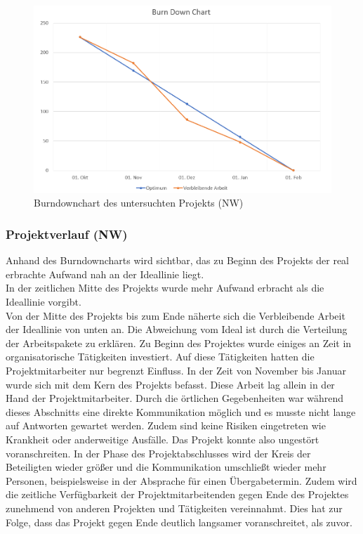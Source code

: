 \documentclass[ThesisDJ.tex]{subfiles}
\begin{document}
\begin{figure}
    \centering
    \includegraphics[width=\linewidth]{burnDownChart.png}
    \caption{Burndownchart des untersuchten Projekts (NW)}
    \label{fig:realburndown}
\end{figure}

\subsubsection{Projektverlauf (NW)}

Anhand des Burndowncharts wird sichtbar, das zu Beginn des Projekts der real erbrachte Aufwand nah an der Ideallinie liegt.\\
In der zeitlichen Mitte des Projekts wurde mehr Aufwand erbracht als die Ideallinie vorgibt.\\
Von der Mitte des Projekts bis zum Ende näherte sich die Verbleibende Arbeit der Ideallinie von unten an.
Die Abweichung vom Ideal ist durch die Verteilung der Arbeitspakete zu erklären. Zu Beginn des Projektes wurde einiges an Zeit in organisatorische Tätigkeiten investiert. Auf diese Tätigkeiten hatten die Projektmitarbeiter nur begrenzt Einfluss. In der Zeit von November bis Januar wurde sich mit dem Kern des Projekts befasst. Diese Arbeit lag allein in der Hand der Projektmitarbeiter. Durch die örtlichen Gegebenheiten war während dieses Abschnitts eine direkte Kommunikation möglich und es musste nicht lange auf Antworten gewartet werden. Zudem sind keine Risiken eingetreten wie Krankheit oder anderweitige Ausfälle. Das Projekt konnte also ungestört voranschreiten. 
In der Phase des Projektabschlusses wird der Kreis der Beteiligten wieder größer und die Kommunikation umschließt wieder mehr Personen, beispielsweise in der Absprache für einen Übergabetermin. Zudem wird die zeitliche Verfügbarkeit der Projektmitarbeitenden gegen Ende des Projektes zunehmend von anderen Projekten und Tätigkeiten vereinnahmt. Dies hat zur Folge, dass das Projekt gegen Ende deutlich langsamer voranschreitet, als zuvor.
\end{document}
